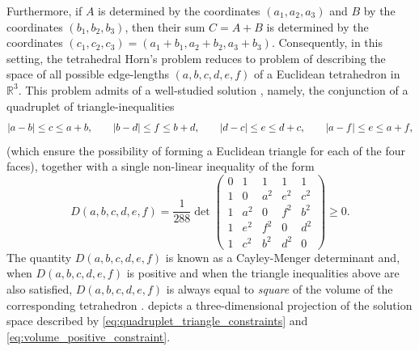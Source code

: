\documentclass[notitlepage, 10pt]{article}
\begin{document}
\begin{exam}[Tetrahedral Horn's problem for \texorpdfstring{$d=2$}{d=2}]
\begin{equation}
    \end{equation}
    Furthermore, if $A$ is determined by the coordinates $(a_1,a_2,a_3)$ and $B$ by the coordinates $(b_1,b_2,b_3)$, then their sum $C=A+B$ is determined by the coordinates $(c_1, c_2, c_3) = (a_1 + b_1, a_2 + b_2, a_3 + b_3)$.
    Consequently, in this setting, the tetrahedral Horn's problem reduces to problem of describing the space of all possible edge-lengths $(a,b,c,d,e,f)$ of a Euclidean tetrahedron in $\mathbb R^{3}$. 
    This problem admits of a well-studied solution \cite{richardson1902trigonometry,wirth2009edge}, namely, the conjunction of a quadruplet of triangle-inequalities 
    \begin{equation}
        \label{eq:quadruplet_triangle_constraints}
        \left|a-b\right| \leq c \leq a+b, \qquad
        \left|b-d\right| \leq f \leq b+d, \qquad
        \left|d-c\right| \leq e \leq d+c, \qquad
        \left|a-f\right| \leq e \leq a+f,
    \end{equation}
    (which ensure the possibility of forming a Euclidean triangle for each of the four faces),
    together with a single non-linear inequality of the form
    \begin{equation}
        \label{eq:volume_positive_constraint}
        D(a,b,c,d,e,f) = \frac{1}{288}\det 
        \begin{pmatrix}
            0 & 1 & 1 & 1 & 1 \\ 
            1 & 0 & a^2 & e^2 & c^2 \\ 
            1 & a^2 & 0 & f^2 & b^2 \\ 
            1 & e^2 & f^2 & 0 & d^2 \\ 
            1 & c^2 & b^2 & d^2 & 0
        \end{pmatrix}
        \geq 0.
    \end{equation}
    The quantity $D(a,b,c,d,e,f)$ is known as a Cayley-Menger determinant and, when $D(a,b,c,d,e,f)$ is positive and when the triangle inequalities above are also satisfied, $D(a,b,c,d,e,f)$ is always equal to \textit{square} of the volume of the corresponding tetrahedron \cite{sitharam2018handbook}.
     depicts a three-dimensional projection of the solution space described by \cref{eq:quadruplet_triangle_constraints} and \cref{eq:volume_positive_constraint}.


\end{exam}
\end{document}
